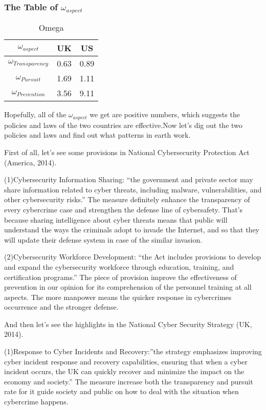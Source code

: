 \documentclass[12pt]{article}
\begin{document}
	\subsubsection{The Table of $\omega_{aspect}$}
		\begin{table}[H]
		\centering
		\caption{Omega}
		\label{tab:Omega}
		\begin{tabular}{|c|c|c|}
			
			\hline
			$\omega_{aspect}$ & UK & US\\
			\hline
			$\omega_{Transparency}$ & 0.63 & 0.89 \\
			\hline
			$\omega_{Pursuit}$ & 1.69 & 1.11 \\
			\hline
			$\omega_{Prevention}$ & 3.56 & 9.11 \\
			\hline

			
		\end{tabular}
		
	\end{table}
		Hopefully, all of the $\omega_{aspect}$ we get are positive numbers, which suggests the policies and laws of the two countries are effective.Now let’s dig out the two policies and laws and find out what patterns in earth work.
	
		First of all, let’s see some provisions in National Cybersecurity Protection Act (America, 2014).
		
		(1)Cybersecurity Information Sharing: “the government and private sector may share information related to cyber threats, including malware, vulnerabilities, and other cybersecurity risks.” The measure definitely enhance the transparency of every cybercrime case and strengthen the defense line of cybersafety. That’s because sharing intelligence about cyber threats means that public will understand the ways the criminals adopt to invade the Internet, and so that they will update their defense system in case of the similar invasion.
	
		(2)Cybersecurity Workforce Development: “the Act includes provisions to develop and expand the cybersecurity workforce through education, training, and certification programs.” The piece of provision improve the effectiveness of prevention in our opinion for its comprehension of the personnel training at all aspects. The more manpower means the quicker response in cybercrimes occurrence and the stronger defense.
	
		And then let’s see the highlights in the National Cyber Security Strategy (UK, 2014).
		
		(1)Response to Cyber Incidents and Recovery:”the strategy emphasizes improving cyber incident response and recovery capabilities, ensuring that when a cyber incident occurs, the UK can quickly recover and minimize the impact on the economy and society.” The measure increase both the transparency and pursuit rate for it guide society and public on how to deal with the situation when cybercrime happens.
	
\end{document}
